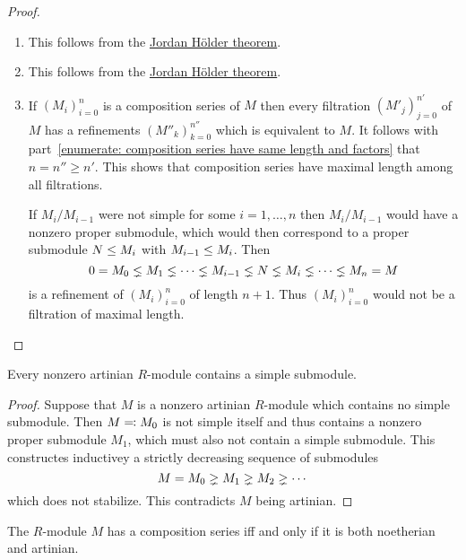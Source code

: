 \begin{proof}
  \leavevmode
  \begin{enumerate}
    \item
      This follows from the \hyperref[theorem: jordan hoelder theorem]{Jordan Hölder theorem}.
    \item
      This follows from the \hyperref[theorem: jordan hoelder theorem]{Jordan Hölder theorem}.
    \item
      If $(M_i)_{i=0}^n$ is a composition series of $M$ then every filtration $(M'_j)_{j=0}^{n'}$ of $M$ has a refinements $(M''_k)_{k=0}^{n''}$ which is equivalent to $M$.
      It follows with part~\ref*{enumerate: composition series have same length and factors} that $n = n'' \geq n'$.
      This shows that composition series have maximal length among all filtrations.
      
      If $M_i/M_{i-1}$ were not simple for some $i = 1, \dotsc, n$ then $M_i/M_{i-1}$ would have a nonzero proper submodule, which would then correspond to a proper submodule $N \leq M_i$ with $M_{i-1} \leq M_i$.
      Then
      \[
                    0
        =           M_0
        \lneq  M_1
        \lneq  \dotsb
        \lneq  M_{i-1}
        \lneq  N
        \lneq  M_i
        \lneq  \dotsb
        \lneq  M_n
        =           M
      \]
      is a refinement of $(M_i)_{i=0}^n$ of length $n+1$.
      Thus $(M_i)_{i=0}^n$ would not be a filtration of maximal length.
    \qedhere
  \end{enumerate}
\end{proof}


\begin{lemma}
  \label{lemma: artinian contains simple}
  Every nonzero artinian $R$-module contains a simple submodule.
\end{lemma}


\begin{proof}
  Suppose that $M$ is a nonzero artinian $R$-module which contains no simple submodule.
  Then $M \eqqcolon M_0$ is not simple itself and thus contains a nonzero proper submodule $M_1$, which must also not contain a simple submodule.
  This constructes inductivey a strictly decreasing sequence of submodules
  \[
                M
    =           M_0
    \gneq M_1
    \gneq M_2
    \gneq \dotsb
  \]
  which does not stabilize.
  This contradicts $M$ being artinian.
\end{proof}


\begin{proposition}
  The $R$-module $M$ has a composition series iff and only if it is both noetherian and artinian.
\end{proposition}


